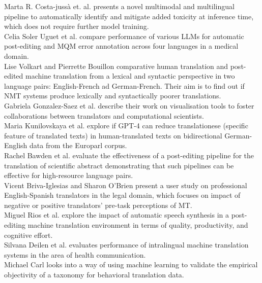 Marta R. Costa-jussà et. al. presents a novel multimodal and multilingual pipeline to automatically identify and mitigate added toxicity at inference time, which does not require further model training.
\\

Celia Soler Uguet et al. compare performance of various LLMs for automatic post-editing and MQM error annotation across four languages in a medical domain.
\\

Lise Volkart and Pierrette Bouillon comparative human translation and post-edited machine translation from a lexical and syntactic perspective in two language pairs: English-French ad German-French. Their aim is to find out if NMT systems produce lexically and syntactically poorer translations.
\\

Gabriela Gonzalez-Saez et al. describe their work  on visualisation tools to foster collaborations between translators and computational scientists. 
\\

Maria Kunilovskaya et al. explore if GPT-4 can reduce translationese (specific feature of translated texts) in human-translated texts on bidirectional German-English data from the Europarl corpus.
\\

Rachel Bawden et al. evaluate the effectiveness of a post-editing pipeline for the translation of scientific abstract demonstrating that such pipelines can be effective for high-resource language pairs.
\\

Vicent Briva-Iglesias and Sharon O'Brien present a user study on professional English-Spanish translators in the legal domain, which focuses on impact of negative or positive translators’ pre-task perceptions of MT.
\\

Miguel Rios et al. explore the impact of automatic speech synthesis in a post-editing machine translation environment in terms of quality, productivity, and cognitive effort.
\\

Silvana Deilen et al. evaluates performance of intralingual machine translation systems in the area of health communication.
\\

Michael Carl looks into a way of using  machine learning to validate the empirical objectivity of a taxonomy for behavioral translation data.
\\

